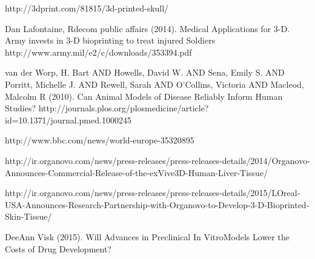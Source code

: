 \documentclass[12pt]{article} %
\begin{document}
\begin{thebibliography}{99}
\begin{small}
\newblock http://3dprint.com/81815/3d-printed-skull/

\newblock Dan Lafontaine, Rdecom public affairs (2014).
\newline Medical Applications for 3-D. Army invests in 3-D bioprinting to treat injured Soldiers
\newblock http://www.army.mil/e2/c/downloads/353394.pdf

\newblock van der Worp, H. Bart AND Howells, David W. AND Sena, Emily S. AND Porritt, Michelle J. AND Rewell, Sarah AND O'Collins, Victoria AND Macleod, Malcolm R
(2010). 
\newline Can Animal Models of Disease Reliably Inform Human Studies?
\newblock http://journals.plos.org/plosmedicine/article?id=10.1371/journal.pmed.1000245

\newblock http://www.bbc.com/news/world-europe-35320895

\newblock http://ir.organovo.com/news/press-releases/press-releases-details/2014/Organovo-Announces-Commercial-Release-of-the-exVive3D-Human-Liver-Tissue/

\newblock http://ir.organovo.com/news/press-releases/press-releases-details/2015/LOreal-USA-Announces-Research-Partnership-with-Organovo-to-Develop-3-D-Bioprinted-Skin-Tissue/

\newblock DeeAnn Visk (2015).
\newline Will Advances in Preclinical In VitroModels Lower the Costs of Drug Development?

\end{small}
\end{thebibliography}

\end{document}
